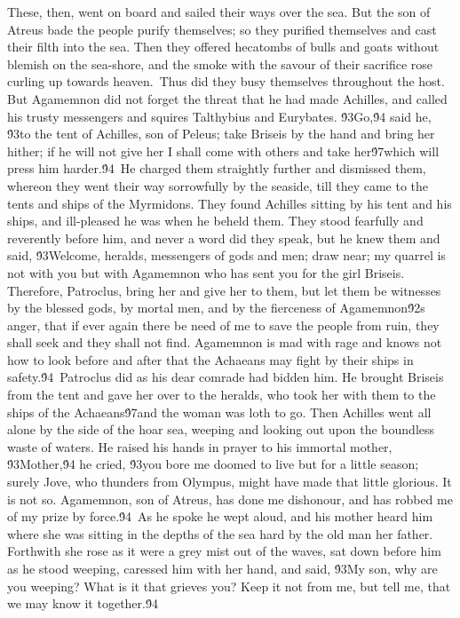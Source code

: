 {These, then, went on board and sailed their ways over the sea. But the son of Atreus bade the people purify themselves; so they purified themselves and cast their filth into the sea. Then they offered hecatombs of bulls and goats without blemish on the sea-shore, and the smoke with the savour of their sacrifice rose curling up towards heaven.\
Thus did they busy themselves throughout the host. But Agamemnon did not forget the threat that he had made Achilles, and called his trusty messengers and squires Talthybius and Eurybates. \'93Go,\'94 said he, \'93to the tent of Achilles, son of Peleus; take Briseis by the hand and bring her hither; if he will not give her I shall come with others and take her\'97which will press him harder.\'94\
He charged them straightly further and dismissed them, whereon they went their way sorrowfully by the seaside, till they came to the tents and ships of the Myrmidons. They found Achilles sitting by his tent and his ships, and ill-pleased he was when he beheld them. They stood fearfully and reverently before him, and never a word did they speak, but he knew them and said, \'93Welcome, heralds, messengers of gods and men; draw near; my quarrel is not with you but with Agamemnon who has sent you for the girl Briseis. Therefore, Patroclus, bring her and give her to them, but let them be witnesses by the blessed gods, by mortal men, and by the fierceness of Agamemnon\'92s anger, that if ever again there be need of me to save the people from ruin, they shall seek and they shall not find. Agamemnon is mad with rage and knows not how to look before and after that the Achaeans may fight by their ships in safety.\'94\
Patroclus did as his dear comrade had bidden him. He brought Briseis from the tent and gave her over to the heralds, who took her with them to the ships of the Achaeans\'97and the woman was loth to go. Then Achilles went all alone by the side of the hoar sea, weeping and looking out upon the boundless waste of waters. He raised his hands in prayer to his immortal mother, \'93Mother,\'94 he cried, \'93you bore me doomed to live but for a little season; surely Jove, who thunders from Olympus, might have made that little glorious. It is not so. Agamemnon, son of Atreus, has done me dishonour, and has robbed me of my prize by force.\'94\
As he spoke he wept aloud, and his mother heard him where she was sitting in the depths of the sea hard by the old man her father. Forthwith she rose as it were a grey mist out of the waves, sat down before him as he stood weeping, caressed him with her hand, and said, \'93My son, why are you weeping? What is it that grieves you? Keep it not from me, but tell me, that we may know it together.\'94\
}
